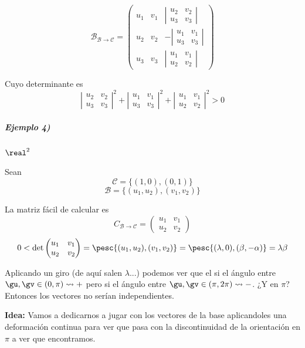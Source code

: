  \[\mathcal{B}_{\mathcal{B}\to\mathcal{C}} = \begin{pmatrix}
u_1&v_1& \left|\begin{array}{cc} u_2&v_2\\u_3&v_3 \end{array}\right|\\

u_2&v_2& -\left|\begin{array}{cc} u_1&v_1\\u_3&v_3 \end{array}\right|\\

u_3&v_3& \left|\begin{array}{cc} u_1&v_1\\u_2&v_2\end{array}\right|
 \end{pmatrix}\]

 Cuyo determinante es \[\left|\begin{array}{cc}u_2&v_2\\u_3&v_3\end{array}\right|^2+\left|\begin{array}{cc}u_1&v_1\\u_3&v_3\end{array}\right|^2+\left|\begin{array}{cc}u_1&v_1\\u_2&v_2\end{array}\right|^2>0\]


\subparagraph{Ejemplo 4)} $\real^2$

Sean \[\mathcal{C} = \{(1,0),(0,1)\}\]
\[\mathcal{B} = \{(u_1,u_2),(v_1,v_2)\}\]

La matriz fácil de calcular es \[C_{\mathcal{B}\to \mathcal{C}} = \begin{pmatrix} u_1&v_1\\u_2&v_2\end{pmatrix}\]
\[0<\det \begin{pmatrix} u_1&v_1\\u_2&v_2\end{pmatrix}  = \pesc{(u_1,u_2),(v_1,v_2)} = \pesc{(\lambda,0),(\beta,-\alpha)} = \lambda\beta\]

Aplicando un giro (de aquí salen $\lambda$...) podemos ver que el si el ángulo entre $\gu,\gv \in (0,\pi) \leadsto +$ pero si el ángulo entre $\gu,\gv \in (\pi,2\pi) \leadsto -$. ¿Y en $\pi$? Entonces los vectores no serían independientes.

\textbf{Idea:} Vamos a dedicarnos a jugar con los vectores de la base aplicandoles una deformación continua para ver que pasa con la discontinuidad de la orientación en $\pi$ a ver que encontramos.

